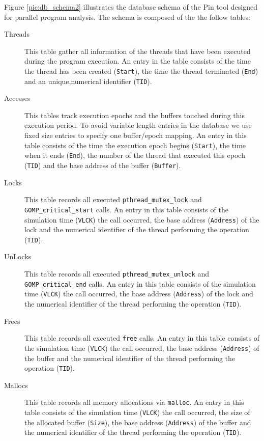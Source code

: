 Figure \ref{pic:db_schema2} illustrates the database
schema of the Pin tool designed for parallel program analysis.
The schema is composed of the the follow tables:
\begin{description}
  \item[Threads] This table gather all information of the threads that
    have been executed during the program execution. An entry in the
    table consists of the time the thread has been created
    (\texttt{Start}), the time the thread terminated (\texttt{End}) and
    an unique,numerical identifier (\texttt{TID}).
  \item[Accesses] This tables track execution epochs and the buffers
    touched during this execution period. To avoid variable length
    entries in the database we use fixed size entries to specify one
    buffer/epoch mapping. An entry in this table consists of the time
    the execution epoch begins (\texttt{Start}), the time when it ends
    (\texttt{End}), the number of the thread that executed this epoch
    (\texttt{TID}) and the base address of the buffer
    (\texttt{Buffer}).
  \item[Locks] This table records all executed 
    \texttt{pthread\_mutex\_lock} and
    \texttt{GOMP\_critical\_start} calls. An entry in this table
    consists of the simulation time (\texttt{VLCK}) the call occurred,
    the base address (\texttt{Address}) of the lock and the
    numerical identifier of the thread performing the operation
    (\texttt{TID}).
  \item[UnLocks] This table records all executed
    \texttt{pthread\_mutex\_unlock} and
    \texttt{GOMP\_critical\_end} calls. An entry in this table
    consists of the simulation time (\texttt{VLCK}) the call occurred,
    the base address (\texttt{Address}) of the lock and the
    numerical identifier of the thread performing the operation
    (\texttt{TID}).
  \item[Frees] This table records all executed \texttt{free} calls. An
    entry in this table consists of the simulation time
    (\texttt{VLCK}) the call occurred, the base address
    (\texttt{Address}) of the buffer and the numerical identifier of
    the thread performing the operation (\texttt{TID}).
  \item[Mallocs] This table records all memory allocations via
    \texttt{malloc}. An entry in this table consists of the simulation
    time (\texttt{VLCK}) the call occurred, the size of the allocated
    buffer (\texttt{Size}), the base address (\texttt{Address}) of
    the buffer and the numerical identifier of
    the thread performing the operation (\texttt{TID}).
\end{description}

